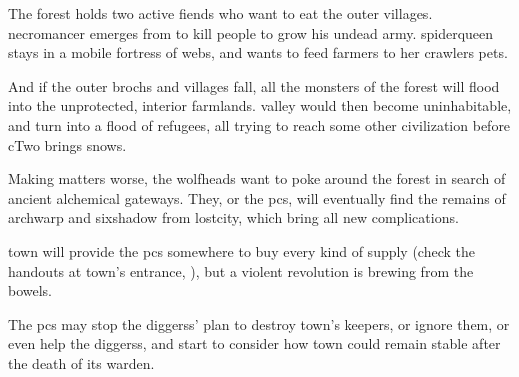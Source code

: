 \begin{multicols}{2}
\noindent
The forest holds two active \glspl{fiend} who want to eat the outer \glspl{village}.
\Gls{necromancer} emerges from  to kill people to grow his undead army.
\Gls{spiderqueen} stays in a mobile fortress of webs, and wants to feed farmers to her \glspl{crawler} pets.

And if the outer \glspl{broch} and \glspl{village} fall, all the \glspl{monster} of the forest will flood into the unprotected, interior farmlands.
\Gls{valley} would then become uninhabitable, and turn into a flood of refugees, all trying to reach some other civilization before \gls{cTwo} brings \glspl{snow}.

\end{multicols}

Making matters worse, the \glspl{wolfhead} want to poke around the forest in search of ancient alchemical gateways.
They, or the \glspl{pc}, will eventually find the remains of \gls{archwarp} and \gls{sixshadow} from \gls{lostcity}, which bring all new complications.


\begin{multicols}{2}
\noindent
\Gls{town} will provide the \glspl{pc} somewhere to buy every kind of supply (check the handouts at \gls{town}'s entrance, ), but a violent revolution is brewing from the bowels.

The \glspl{pc} may stop the \glspl{diggers}' plan to destroy \gls{town}'s \glspl{keeper}, or ignore them, or even help the \glspl{diggers}, and start to consider how \gls{town} could remain stable after the death of its \gls{warden}.
\end{multicols}



